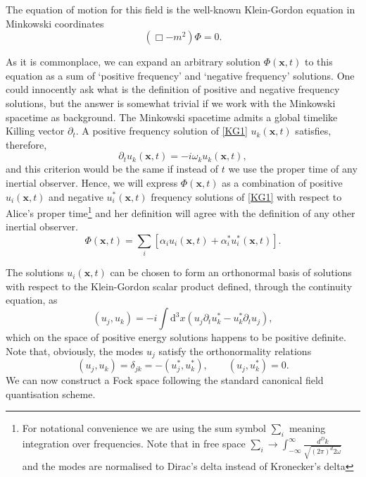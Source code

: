 The equation of motion for this field is the well-known Klein-Gordon equation in Minkowski coordinates
\begin{equation}\label{KG1}
(\Box -m^2)\Phi =0.
\end{equation}

As it is commonplace, we can expand an arbitrary solution $\Phi(\bm x,t)$ to this equation as a sum of `positive frequency' and `negative frequency' solutions. One could innocently ask what is the definition of positive and negative frequency solutions, but the answer is somewhat trivial if we work with the Minkowski spacetime as background. The Minkowski spacetime admits a global timelike Killing vector $\partial_t$. A positive frequency solution of \eqref{KG1} $u_k(\bm x,t)$ satisfies, therefore,
\begin{equation}\label{flatcriterion}
\partial_t u_k(\bm x,t)=-i\omega_ku_k(\bm x,t),
\end{equation}
and this criterion would be the same if instead of $t$ we use the proper time of any inertial observer. Hence, we will express  $\Phi(\bm x,t)$ as a combination of positive $u_i(\bm x,t)$ and negative  $u^*_i(\bm x,t)$ frequency solutions of \eqref{KG1} with respect to Alice's proper time\footnote{For notational convenience we are using the sum symbol $\sum_i$ meaning integration over frequencies. Note that in free space $\sum_i\rightarrow\int_{-\infty}^\infty \frac{d^Dk}{\sqrt{(2\pi)^d2\omega}}$ and the modes are normalised to Dirac's delta instead of Kronecker's delta} and her definition will agree  with the definition of any other inertial observer.
\begin{equation}\label{exp1}
\Phi(\bm x,t)=\sum_i \left[\alpha_i u_i(\bm x,t)+\alpha_i^* u^*_i(\bm x,t)\right].
\end{equation}

The solutions $u_i(\bm x,t)$ can be chosen to form an orthonormal basis of solutions with respect to the Klein-Gordon scalar product defined, through the continuity equation, as
\begin{equation}\label{KGsc}
(u_j,u_k)=-i\int \text{d}^3x\left(u_j\partial_tu_k^*-u_k^*\partial_tu_j\right),
\end{equation}
which on the space of positive energy solutions happens to be positive definite. Note that, obviously, the modes $u_j$ satisfy the orthonormality relations
\begin{equation}\label{orto}
(u_j,u_k)=\delta_{jk}=-(u_j^*,u_k^*),\qquad (u_j,u_k^*)=0.
\end{equation}
We can now construct a Fock space following the standard canonical field quantisation scheme.

